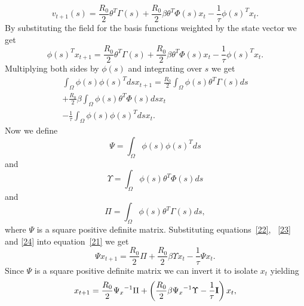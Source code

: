 \documentclass[journal]{IEEEtran}
\begin{document}
\begin{equation}\label{Eq19}
{v_{t + 1}}\left( s \right) = \frac{{{R_0}}}{2}{\theta ^T}\Gamma \left( s \right) + \frac{{{R_0}}}{2}\beta {\theta ^T}\Phi \left( s \right){x_t} - \frac{1}{\tau }\phi {\left( s \right)^T}{x_t}.
\end{equation}
By substituting the field for the basis functions weighted by the state vector we get
\begin{equation}\label{Eq20}
\phi {\left( s \right)^T}{x_{t + 1}} = \frac{{{R_0}}}{2}{\theta ^T}\Gamma \left( s \right) + \frac{{{R_0}}}{2}\beta {\theta ^T}\Phi \left( s \right){x_t} - \frac{1}{\tau }\phi {\left( s \right)^T}{x_t}.
\end{equation}
Multiplying both sides by $\phi(s)$ and integrating over $s$ we get
\begin{align}\label{21}
 \int_\Omega  {\phi \left( s \right)\phi {{\left( s \right)}^T}ds{x_{t + 1}}}  = \frac{{{R_0}}}{2}\int_\Omega  {\phi \left( s \right){\theta ^T}\Gamma \left( s \right)ds}  \nonumber \\
  + \frac{{{R_0}}}{2}\beta \int_\Omega  {\phi \left( s \right){\theta ^T}\Phi \left( s \right)ds} {x_t} \\
  - \frac{1}{\tau }\int_\Omega  {\phi \left( s \right)\phi {{\left( s \right)}^T}ds} {x_t}. \nonumber
\end{align}
Now we define
\begin{equation}\label{22}
\Psi  = \int_\Omega  {\phi \left( s \right)\phi {{\left( s \right)}^T}ds}
\end{equation}
and
\begin{equation}\label{23}
\Upsilon  = \int_\Omega  {\phi \left( s \right){\theta ^T}\Phi \left( s \right)ds}
\end{equation}
and
\begin{equation}\label{24}
\Pi  = \int_\Omega  {\phi \left( s \right){\theta ^T}\Gamma \left( s \right)ds},
\end{equation}
where $\Psi$ is a square positive definite matrix. Substituting equations~\ref{22}, ~\ref{23} and \ref{24} into equation~\ref{21} we get
\begin{equation}\label{25}
\Psi {x_{t + 1}} = \frac{{{R_0}}}{2}\Pi  + \frac{{{R_0}}}{2}\beta \Upsilon {x_t} - \frac{1}{\tau }\Psi {x_t}.
\end{equation}
Since $\Psi$ is a square positive definite matrix we can invert it to isolate $x_t$ yielding
\begin{equation}\label{26}
{x_{t + 1}} = \frac{{{R_0}}}{2}{\Psi _x}^{ - 1}\Pi  + \left( {\frac{{{R_0}}}{2}\beta {\Psi _x}^{ - 1}\Upsilon  - \frac{1}{\tau }{\bf{I}}} \right){x_t},
\end{equation}
\end{document}
